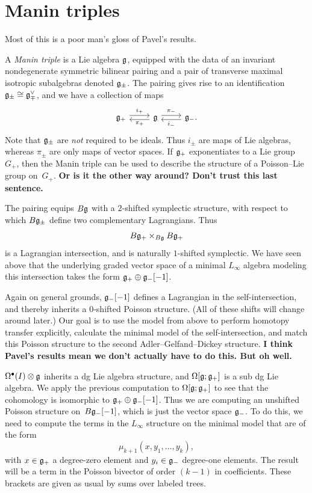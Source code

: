 \documentclass[12pt]{amsart}
\begin{document}
\section{Manin triples}
Most of this is a poor man's gloss of Pavel's results.

A \emph{Manin triple} is a Lie algebra $\mathfrak g$, equipped with the data of an invariant nondegenerate symmetric bilinear pairing and a pair of transverse maximal isotropic subalgebras  denoted $\mathfrak g_\pm$.
The pairing gives rise to an identification $\mathfrak g_\pm \cong \mathfrak g_\mp^\vee$, and we have a collection of maps
\[
\begin{tikzcd}
\fg_+ \ar[r, shift left, "i_+"] & \fg \ar[l, shift left, "\pi_+"] \ar[r, shift left, "\pi_-"] &  \fg_- \ar[l, shift left, "i_-"].
\end{tikzcd}
\]
Note that $\mathfrak g_\pm$ are \emph{not} required to be ideals. Thus $i_\pm$ are maps of Lie algebras, whereas $\pi_\pm$ are only maps of vector spaces.
If $\mathfrak g_+$ exponentiates to a Lie group $G_+$, then the Manin triple can be used to describe the structure of a Poisson--Lie group on~$G_+$. \textbf{Or is it the other way around? Don't trust this last sentence.}

The pairing equips $B\mathfrak g$ with a $2$-shifted symplectic structure, with respect to which $B\mathfrak g_\pm$ define two complementary Lagrangians. Thus
\[
B\mathfrak g_+ \times_{B\mathfrak g} B\mathfrak g_+
\]
is a Lagrangian intersection, and is naturally $1$-shifted symplectic. We have seen above that the underlying graded vector space of a minimal $L_\infty$ algebra modeling this intersection takes the form $\mathfrak g_+ \oplus \mathfrak g_-[-1]$.

Again on general grounds, $\mathfrak g_-[-1]$ defines a Lagrangian in the self-intersection, and thereby inherits a $0$-shifted Poisson structure. 
(All of these shifts will change around later.) Our goal is to use the model from above to perform homotopy transfer explicitly, calculate the minimal model of the self-intersection, and match this Poisson structure to the second Adler--Gelfand--Dickey structure. \textbf{I think Pavel's results mean we don't actually have to do this. But oh well.}

$\Omega^\bullet(I) \otimes \mathfrak g$ inherits a dg Lie algebra structure, and $\Omega[\mathfrak g;\mathfrak g_+]$ is a sub dg Lie algebra. We apply the previous computation to $\Omega[\mathfrak g;\mathfrak g_+]$ to see that the cohomology is isomorphic to $\mathfrak g_+ \oplus \mathfrak g_-[-1]$. Thus we are computing an unshifted Poisson structure on~$B \mathfrak g_-[-1]$, which is just the vector space $\mathfrak g_-$. To do this, we need to compute the terms in the $L_\infty$ structure on the minimal model that are of the form
\[
\mu_{k+1}(x, y_1, \ldots, y_k),
\]
with $x \in \mathfrak g_+$ a degree-zero element and $y_i \in \mathfrak g_-$ degree-one elements. The result will be a term in the Poisson bivector of order $(k-1)$ in coefficients. These brackets are given as usual by sums over labeled trees.
\end{document}
